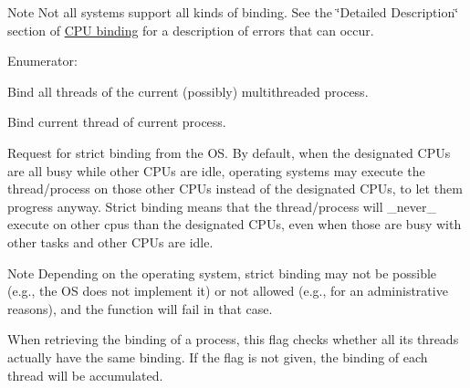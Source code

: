 \begin{DoxyNote}{Note}
Not all systems support all kinds of binding. See the \char`\"{}Detailed Description\char`\"{} section of \hyperlink{a00049}{CPU binding} for a description of errors that can occur. 
\end{DoxyNote}
\begin{Desc}
\item[Enumerator: ]\par
\begin{description}
\item[{\em 
\hypertarget{a00049_gga217dc8d373f8958cc93c154ebce1c71ca2e0dd0128dac6b03408c7dd170477fdc}{
HWLOC\_\-CPUBIND\_\-PROCESS}
\label{a00049_gga217dc8d373f8958cc93c154ebce1c71ca2e0dd0128dac6b03408c7dd170477fdc}
}]Bind all threads of the current (possibly) multithreaded process. \item[{\em 
\hypertarget{a00049_gga217dc8d373f8958cc93c154ebce1c71caf1b6bbad00d7b1017b918e3719f4d421}{
HWLOC\_\-CPUBIND\_\-THREAD}
\label{a00049_gga217dc8d373f8958cc93c154ebce1c71caf1b6bbad00d7b1017b918e3719f4d421}
}]Bind current thread of current process. \item[{\em 
\hypertarget{a00049_gga217dc8d373f8958cc93c154ebce1c71ca679a7e0f0c7ee06b123565f90d98e7fa}{
HWLOC\_\-CPUBIND\_\-STRICT}
\label{a00049_gga217dc8d373f8958cc93c154ebce1c71ca679a7e0f0c7ee06b123565f90d98e7fa}
}]Request for strict binding from the OS. By default, when the designated CPUs are all busy while other CPUs are idle, operating systems may execute the thread/process on those other CPUs instead of the designated CPUs, to let them progress anyway. Strict binding means that the thread/process will \_\-never\_\- execute on other cpus than the designated CPUs, even when those are busy with other tasks and other CPUs are idle.

\begin{DoxyNote}{Note}
Depending on the operating system, strict binding may not be possible (e.g., the OS does not implement it) or not allowed (e.g., for an administrative reasons), and the function will fail in that case.
\end{DoxyNote}
When retrieving the binding of a process, this flag checks whether all its threads actually have the same binding. If the flag is not given, the binding of each thread will be accumulated.


\end{description}
\end{Desc}

